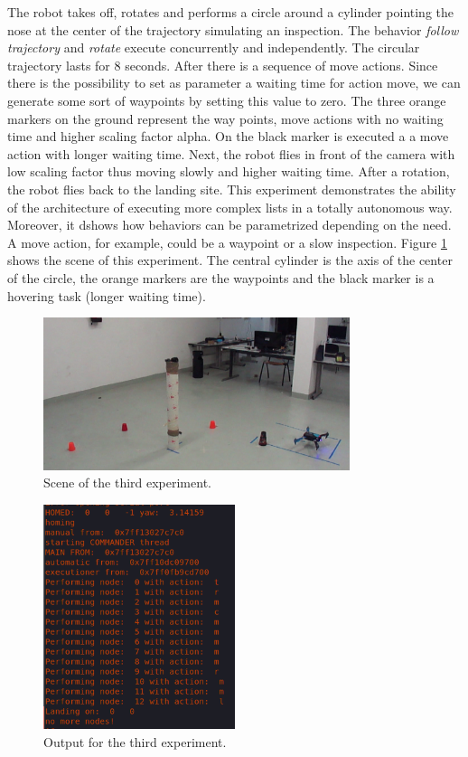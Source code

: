 The robot takes off, rotates and performs a circle around a cylinder pointing the nose at the center of the trajectory simulating an inspection. The behavior \textit{follow trajectory} and \textit{rotate} execute concurrently and independently. The circular trajectory lasts for 8 seconds. After there is a sequence of move actions. Since there is the possibility to set as parameter a waiting time for action move, we can generate some sort of waypoints by setting this value to zero. The three orange markers on the ground represent the way points, move actions with no waiting time and higher scaling factor alpha. On the black marker is executed a a move action with longer waiting time. Next, the robot flies in front of the camera with low scaling factor thus moving slowly and higher waiting time. After a rotation, the robot flies back to the landing site. This experiment demonstrates the ability of the architecture of executing more complex lists in a totally autonomous way. Moreover, it dshows how behaviors can be parametrized depending on the need. A move action, for example, could be a waypoint or a slow inspection. Figure \ref{figure:circle} shows the scene of this experiment. The central cylinder is the axis of the center of the circle, the orange markers are the waypoints and the black marker is a hovering task (longer waiting time).

\begin{figure}[h]
\centering
 \includegraphics[width=0.8\textwidth]{circle.png}
 \caption{Scene of the third experiment.}
 \label{figure:circle}
\end{figure}


\begin{figure}[h]
\centering
 \includegraphics[width=0.5\textwidth]{snippet.png}
 \caption{Output for the third experiment.}
 \label{figure:snip}
\end{figure}














